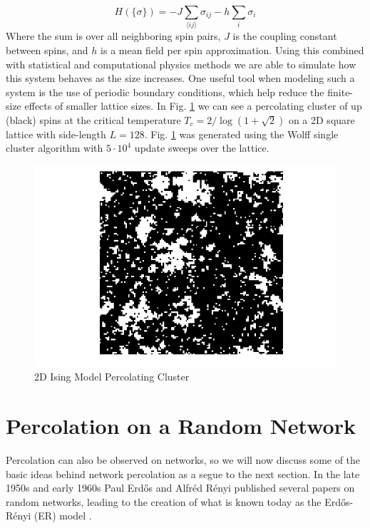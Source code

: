 \begin{equation}
	\label{eqn:Ising_Hamiltonian}
	H(\{\sigma\}) = -J \sum_{\langle i j \rangle} \sigma_{ij} -h \sum_i \sigma_i
\end{equation}
Where the sum is over all neighboring spin pairs, $J$ is the coupling constant between spins, and $h$ is a mean field per spin approximation.
Using this combined with statistical and computational physics methods we are able to simulate how this system behaves as the size increases.
One useful tool when modeling such a system is the use of periodic boundary conditions, which help reduce the finite-size effects of smaller lattice sizes.
In Fig. \ref{fig:Ising_percolation} we can see a percolating cluster of up (black) spins at the critical temperature $T_c = 2 / \log(1 + \sqrt{2})$ on a 2D square lattice with side-length $L = 128$.
Fig. \ref{fig:Ising_percolation} was generated using the Wolff single cluster algorithm with $5 \cdot 10^4$ update sweeps over the lattice.

\begin{figure}[H]
	\centering
	\includegraphics[width=350pt]{images/Ising_128_percolation.png}
	\caption{2D Ising Model Percolating Cluster}
	\label{fig:Ising_percolation}
\end{figure}



\section{Percolation on a Random Network}
Percolation can also be observed on networks, so we will now discuss some of the basic ideas behind network percolation as a segue to the next section.
In the late 1950s and early 1960s Paul Erdős and Alfréd Rényi published several papers on random networks, leading to the creation of what is known today as the Erdős-Rényi (ER) model \cite{ER_1} \cite{ER_2}.

